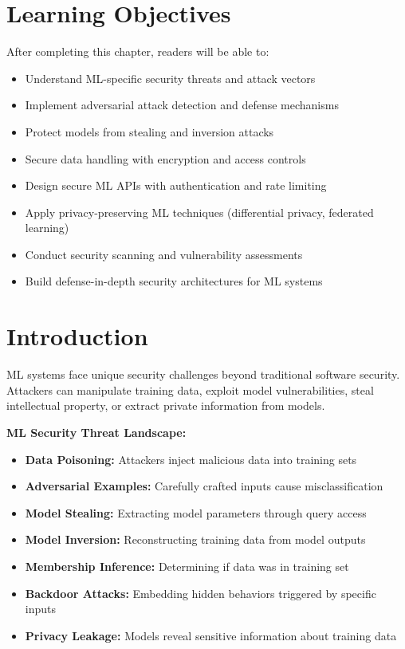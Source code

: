\section{Learning Objectives}

After completing this chapter, readers will be able to:
\begin{itemize}
    \item Understand ML-specific security threats and attack vectors
    \item Implement adversarial attack detection and defense mechanisms
    \item Protect models from stealing and inversion attacks
    \item Secure data handling with encryption and access controls
    \item Design secure ML APIs with authentication and rate limiting
    \item Apply privacy-preserving ML techniques (differential privacy, federated learning)
    \item Conduct security scanning and vulnerability assessments
    \item Build defense-in-depth security architectures for ML systems
\end{itemize}

\section{Introduction}

ML systems face unique security challenges beyond traditional software security. Attackers can manipulate training data, exploit model vulnerabilities, steal intellectual property, or extract private information from models.

\textbf{ML Security Threat Landscape:}

\begin{itemize}
    \item \textbf{Data Poisoning:} Attackers inject malicious data into training sets
    \item \textbf{Adversarial Examples:} Carefully crafted inputs cause misclassification
    \item \textbf{Model Stealing:} Extracting model parameters through query access
    \item \textbf{Model Inversion:} Reconstructing training data from model outputs
    \item \textbf{Membership Inference:} Determining if data was in training set
    \item \textbf{Backdoor Attacks:} Embedding hidden behaviors triggered by specific inputs
    \item \textbf{Privacy Leakage:} Models reveal sensitive information about training data
\end{itemize}

